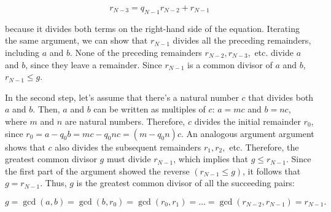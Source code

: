 \[
r_{N-3} = q_{N-1} r_{N-2} + r_{N-1}
\]

because it divides both terms on the right-hand side of the equation. Iterating the same argument, we can show that $r_{N-1}$ divides all the preceding remainders, including $a$ and $b$. None of the preceding remainders $r_{N-2}, r_{N-3},$ etc. divide $a$ and $b$, since they leave a remainder. Since $r_{N-1}$ is a common divisor of $a$ and $b$, $r_{N-1} \le g$.

In the second step, let's assume that there's a natural number $c$ that divides both $a$ and $b$. Then, $a$ and $b$ can be written as multiples of $c$: $a=m c$ and $b = nc$, where $m$ and $n$ are natural numbers. Therefore, $c$ divides the initial remainder $r_0$, since $r_0 = a - q_0 b = mc - q_0 n c = (m - q_0 n)c$. An analogous argument argument shows that $c$ also divides the subsequent remainders $r_1, r_2,$ etc. Therefore, the greatest common divisor $g$ must divide $r_{N-1}$, which implies that $g \le r_{N-1}$. Since the first part of the argument showed the reverse $(r_{N-1} \le g)$, it follows that $g = r_{N-1}$. Thus, $g$ is the greatest common divisor of all the succeeding pairs:

\[
g = \gcd (a, b) = \gcd (b, r_0) = \gcd (r_0, r_1) = \dots = \gcd (r_{N-2}, r_{N-1}) = r_{N-1}.
\]
